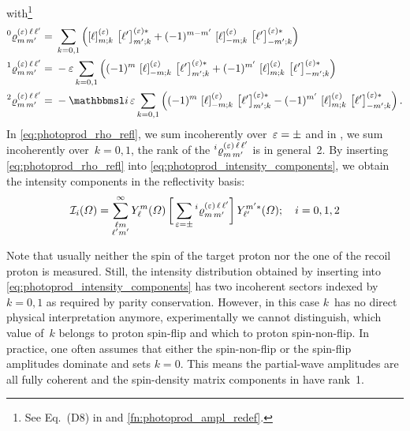 with\footnote{See Eq.~(D8) in  and
\cref{fn:photoprod_ampl_redef}.}
\begin{align}
  \label{eq:photoprod_rho_0_refl}
  \prescript{0}{}{\varrho}^{(\refl)\, \ell\, \ell'}_{m\, m'}
  ={}& \sum_{k = 0, 1} \rBrk[2]{\sBrk{\ell}^{(\refl)}_{m; k}\, \sBrk{\ell'}^{(\refl) *}_{m'; k}
  + (-1)^{m - m'}\, \sBrk{\ell}^{(\refl)}_{{-m}; k}\, \sBrk{\ell'}^{(\refl) *}_{{-m'}; k}}
  \\
  \label{eq:photoprod_rho_1_refl}
  \prescript{1}{}{\varrho}^{(\refl)\, \ell\, \ell'}_{m\, m'}
  ={}& -\refl \sum_{k = 0, 1}
  \rBrk[2]{(-1)^m\, \sBrk{\ell}^{(\refl)}_{{-m}; k}\, \sBrk{\ell'}^{(\refl) *}_{m'; k}
  + (-1)^{m'}\, \sBrk{\ell}^{(\refl)}_{m; k}\, \sBrk{\ell'}^{(\refl) *}_{{-m'}; k}}
  \\
  \label{eq:photoprod_rho_2_refl}
  \prescript{2}{}{\varrho}^{(\refl)\, \ell\, \ell'}_{m\, m'}
  ={}& -\imag\, \refl \sum_{k = 0, 1}
  \rBrk[2]{(-1)^m\, \sBrk{\ell}^{(\refl)}_{{-m}; k}\, \sBrk{\ell'}^{(\refl) *}_{m'; k}
  - (-1)^{m'}\, \sBrk{\ell}^{(\refl)}_{m; k}\, \sBrk{\ell'}^{(\refl) *}_{{-m'}; k}}.
\end{align}
In \cref{eq:photoprod_rho_refl}, we sum incoherently over~$\varepsilon =
\pm$ and in
, we sum
incoherently over~$k = 0, 1$, \ie the rank of the
$\prescript{i}{}{\varrho}^{(\varepsilon)\, \ell\, \ell'}_{m\, m'}$ is in
general~2.  By inserting \cref{eq:photoprod_rho_refl} into
\cref{eq:photoprod_intensity_components}, we obtain the intensity
components in the reflectivity basis:
\begin{equation}
  \label{eq:photoprod_intensity_components_refl}
  \intensity_i(\Omega)
  = \sum_{\substack{\ell m \\ \ell' m'}}^\infty
  Y_\ell^m(\Omega)
  \sBrk[3]{\, \sum_{\refl = \pm} \prescript{i}{}{\varrho}^{(\refl)\, \ell\, \ell'}_{m\, m'}}
  Y_{\ell'}^{m' *}(\Omega);
  \quad i = 0, 1, 2
\end{equation}

Note that usually neither the spin of the target proton
nor the one of the recoil proton is measured.  Still, the intensity
distribution obtained by inserting
 into
\cref{eq:photoprod_intensity_components} has two incoherent sectors
indexed by~$k = 0, 1$ as required by parity conservation.  However, in
this case $k$~has no direct physical interpretation anymore, \ie
experimentally we cannot distinguish, which value of~$k$ belongs to
proton spin-flip and which to proton spin-non-flip.  In practice, one
often assumes that either the spin-non-flip or the spin-flip
amplitudes dominate and sets $k = 0$.  This means the partial-wave
amplitudes are all fully coherent and the spin-density matrix
components in
 have
rank~1.

